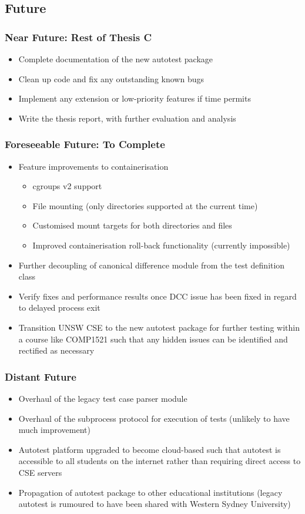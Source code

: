 \documentclass[xcolor, handout]{beamer}
\begin{document}
\subsection{Future}
\begin{frame}
	\frametitle{Near Future: Rest of Thesis C}
	\begin{itemize}
		\setlength\itemsep{1em}
		\item Complete documentation of the new autotest package
			\pause
		\item Clean up code and fix any outstanding known bugs
			\pause
		\item Implement any extension or low-priority features if time permits
			\pause
		\item Write the thesis report, with further evaluation and analysis
	\end{itemize}
\end{frame}
\begin{frame}
	\frametitle{Foreseeable Future: To Complete}
	\begin{itemize}
		\setlength\itemsep{1em}
		\item Feature improvements to containerisation
		\begin{itemize}
			\item cgroups v2 support
				\pause
			\item File mounting (only directories supported at the current time)
				\pause
			\item Customised mount targets for both directories and files
				\pause
			\item Improved containerisation roll-back functionality (currently impossible)
				\pause 
		\end{itemize}
		\item Further decoupling of canonical difference module from the test definition class 
			\pause
		\item Verify fixes and performance results once DCC issue has been fixed in regard to delayed process exit
			\pause
		\item Transition UNSW CSE to the new autotest package for further testing within a course like COMP1521 such that any hidden issues can be identified and rectified as necessary
	\end{itemize}
\end{frame}
\begin{frame}
	\frametitle{Distant Future}
	\begin{itemize}
		\setlength\itemsep{1em}
		\item Overhaul of the legacy test case parser module
			\pause
		\item Overhaul of the subprocess protocol for execution of tests (unlikely to have much improvement) 
			\pause
		\item Autotest platform upgraded to become cloud-based such that autotest is accessible to all students on the internet rather than requiring direct access to CSE servers
			\pause
		\item Propagation of autotest package to other educational institutions (legacy autotest is rumoured to have been shared with Western Sydney University)
	\end{itemize}
\end{frame}
\end{document}

